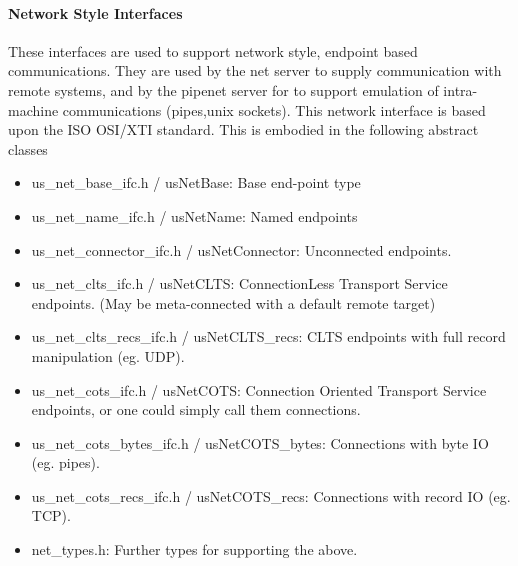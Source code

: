 \paragraph{Network Style Interfaces}
These interfaces are used to support network style, endpoint based
communications.  They are used by the net server to supply communication
with remote systems, and by the pipenet server for to support emulation
of intra-machine communications (pipes,unix sockets).
This network interface is based upon the ISO OSI/XTI standard.
This is embodied in the following abstract classes

\begin{itemize}
\item{us\_net\_base\_ifc.h / usNetBase}: Base end-point type
\item{us\_net\_name\_ifc.h / usNetName}: Named endpoints
\item{us\_net\_connector\_ifc.h / usNetConnector}: Unconnected endpoints.

\item{us\_net\_clts\_ifc.h / usNetCLTS}: ConnectionLess Transport Service 
endpoints.  (May be meta-connected with a default remote target)
\item{us\_net\_clts\_recs\_ifc.h / usNetCLTS\_recs}: CLTS endpoints with
full record manipulation (eg. UDP).

\item{us\_net\_cots\_ifc.h / usNetCOTS}: Connection Oriented Transport Service
endpoints, or one could simply call them connections.
\item{us\_net\_cots\_bytes\_ifc.h / usNetCOTS\_bytes}: Connections with byte IO
(eg. pipes).
\item{us\_net\_cots\_recs\_ifc.h / usNetCOTS\_recs}: Connections with record IO
(eg. TCP).
\item{net\_types.h}: Further types for supporting the above.
\end{itemize}

